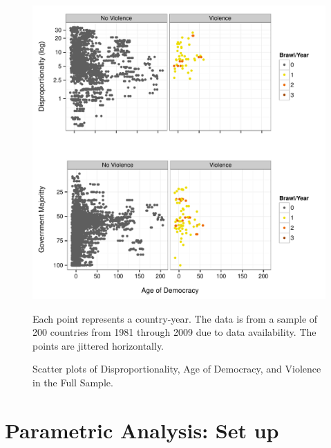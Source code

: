 \documentclass[a4paper]{article}\usepackage[]{graphicx}\usepackage[]{color}
\newenvironment{knitrout}{}{} %
\begin{document}
\begin{figure}[t]
    \caption{Scatter plots of Disproportionality, Age of Democracy, and Violence in the Full Sample.}
    \label{framework_empirical}
    \begin{center}

\begin{knitrout}
\color{fgcolor}
\includegraphics[width=0.8\linewidth]{figure/FrameworkEmpirical} 

\end{knitrout}
    \end{center}
    \begin{singlespace}
        {\scriptsize{Each point represents a country-year. The data is from a sample of 200 countries from 1981 through 2009 due to data availability. The points are jittered horizontally.}}
    \end{singlespace}

\end{figure}



\section{Parametric Analysis: Set up}
\end{document}
